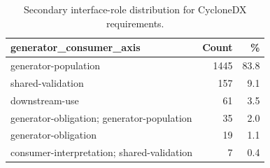 \begin{table}[t]
\caption{Secondary interface-role distribution for CycloneDX requirements.}
\label{tab:cdx-axis-distribution}
\centering
\small
\begin{tabularx}{\columnwidth}{@{}Xrr@{}}
\toprule
\textbf{generator\_consumer\_axis} & \textbf{Count} & \textbf{\%} \\
\midrule
generator-population & 1445 & 83.8 \\
shared-validation & 157 & 9.1 \\
downstream-use & 61 & 3.5 \\
generator-obligation; generator-population & 35 & 2.0 \\
generator-obligation & 19 & 1.1 \\
consumer-interpretation; shared-validation & 7 & 0.4 \\
\bottomrule
\end{tabularx}
\end{table}
